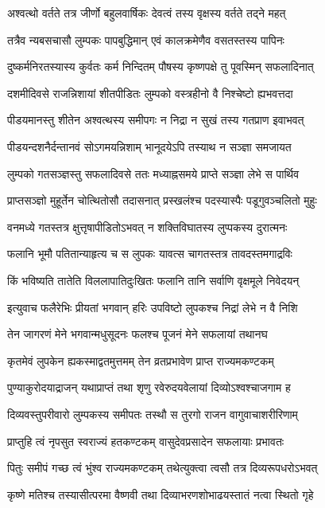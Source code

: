 \twolineshloka
{अश्वत्थो वर्तते तत्र जीर्णो बहुलवार्षिकः}
{देवत्वं तस्य वृक्षस्य वर्तते तद्ने महत्} %

\twolineshloka
{तत्रैव न्यबसचासौ लुम्पकः पापबुद्धिमान्}
{एवं कालक्रमेणैव वसतस्तस्य पापिनः} %

\twolineshloka
{दुष्कर्मनिरतस्यास्य कुर्वतः कर्म निन्दितम्}
{पौषस्य कृष्णपक्षे तु पूवस्मिन् सफलादिनात्} %

\twolineshloka
{दशमीदिवसे राजन्निशायां शीतपीडितः}
{लुम्पको वस्त्रहीनो वै निश्चेष्टो ह्यभवत्तदा} %

\twolineshloka
{पीडयमानस्तु शीतेन अश्वत्थस्य समीपगः}
{न निद्रा न सुखं तस्य गतप्राण इवाभवत्} %

\twolineshloka
{पीडयन्दशनैर्दन्तानवं सोऽगमयन्निशाम्}
{भानूदयेऽपि तस्याथ न सञ्ज्ञा समजायत} %

\twolineshloka
{लुम्पको गतसञ्ज्ञस्तु सफलादिवसे ततः}
{मध्याह्नसमये प्राप्ते सञ्ज्ञा लेभे स पार्थिव} %

\twolineshloka
{प्राप्तसञ्ज्ञो मुहूर्तेन चोत्थितोसौ तदासनात्}
{प्रस्खलंश्च पदस्यास्पैः पडूगुवञ्चलितो मुहुः} %

\twolineshloka
{वनमध्ये गतस्तत्र क्षुत्तृषापीडितोऽभवत्}
{न शक्तिविघातस्य लुप्पकस्य दुरात्मनः} %

\twolineshloka
{फलानि भूमौ पतितान्याहृत्य च स लुपकः}
{यावत्स चागतस्तत्र तावदस्तमगाद्रविः} %

\twolineshloka
{किं भविष्यति तातेति विललापातिदुःखितः}
{फलानि तानि सर्वाणि वृक्षमूले निवेदयन्} %

\twolineshloka
{इत्युवाच फलैरेभिः प्रीयतां भगवान् हरिः}
{उपविष्टो लुपकश्च निद्रां लेभे न वै निशि} %

\twolineshloka
{तेन जागरणं मेने भगवान्मधुसूदनः}
{फलश्च पूजनं मेने सफलायां तथानघ} %

\twolineshloka
{कृतमेवं लुपकेन ह्यकस्माद्वतमुत्तमम्}
{तेन व्रतप्रभावेण प्राप्त राज्यमकण्टकम्} %

\twolineshloka
{पुण्याकुरोदयाद्राजन् यथाप्राप्तं तथा शृणु}
{रवेरुदयवेलायां दिव्योऽश्वश्चाजगाम ह} %

\twolineshloka
{दिव्यवस्तुपरीवारो लुम्पकस्य समीपतः}
{तस्थौ स तुरगो राजन वागुवाचाशरीरिणाम्} %

\twolineshloka
{प्राप्तुहि त्वं नृपसुत स्वराज्यं हतकण्टकम्}
{वासुदेवप्रसादेन सफलायाः प्रभावतः} %

\twolineshloka
{पितुः समीपं गच्छ त्वं भुंश्व राज्यमकण्टकम्}
{तथेत्युक्त्वा त्वसौ तत्र दिव्यरूपधरोऽभवत्} %

\twolineshloka
{कृष्णे मतिश्च तस्यासीत्परमा वैष्णवी तथा}
{दिव्याभरणशोभाढयस्तातं नत्वा स्थितो गृहे} %

